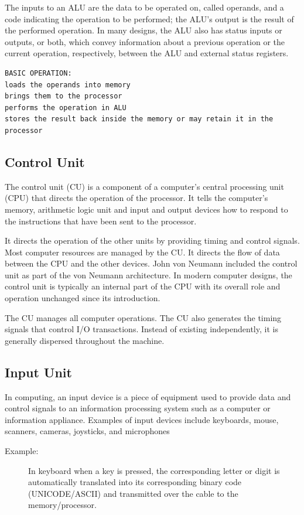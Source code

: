 \documentclass[british]{extreport}
\begin{document}
\noindent The inputs to an ALU are the data to be operated on, called
operands, and a code indicating the operation to be performed; the
ALU's output is the result of the performed operation. In many designs,
the ALU also has status inputs or outputs, or both, which convey information
about a previous operation or the current operation, respectively,
between the ALU and external status registers.
\begin{verbatim}
BASIC OPERATION:
loads the operands into memory
brings them to the processor
performs the operation in ALU
stores the result back inside the memory or may retain it in the processor
\end{verbatim}

\subsection{Control Unit}

\noindent The control unit (CU) is a component of a computer's central
processing unit (CPU) that directs the operation of the processor.
It tells the computer's memory, arithmetic logic unit and input and
output devices how to respond to the instructions that have been sent
to the processor.

\noindent It directs the operation of the other units by providing
timing and control signals. Most computer resources are managed by
the CU. It directs the flow of data between the CPU and the other
devices. John von Neumann included the control unit as part of the
von Neumann architecture. In modern computer designs, the control
unit is typically an internal part of the CPU with its overall role
and operation unchanged since its introduction.

\noindent The CU manages all computer operations. The CU also generates
the timing signals that control I/O transactions. Instead of existing
independently, it is generally dispersed throughout the machine.

\subsection{Input Unit}

In computing, an input device is a piece of equipment used to provide
data and control signals to an information processing system such
as a computer or information appliance. Examples of input devices
include keyboards, mouse, scanners, cameras, joysticks, and microphones
\begin{description}
	\item [{Example:}] In keyboard when a key is pressed, the corresponding
	      letter or digit is automatically translated into its corresponding
	      binary code (UNICODE/ASCII) and transmitted over the cable to the
	      memory/processor.
\end{description}
\end{document}
